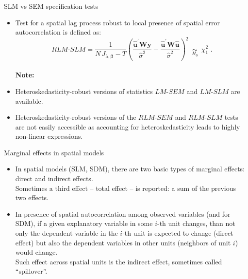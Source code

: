 \documentclass{beamer}
\begin{document}
\begin{frame}{SLM vs SEM specification tests}
\begin{itemize}
    \item Test for a spatial lag process robust to local presence of spatial error autocorrelation is defined as:
    \begin{equation*}
    \textit{RLM-SLM}=\frac{1}{N \, J_{\lambda,\bm{\beta}} - T}
    \left(\frac{\bm{\hat{u}}^{'}\bm{Wy}}{\hat{\sigma}^2}
    - \frac{\bm{\hat{u}}^{'}\bm{W\hat{u}}}{\hat{\sigma}^2} \right)^{2} 
    \,\,\, \underset{H_0}{\sim} \,\,\, \chi_1^2 \,\,.
    \end{equation*}\\
    \bigskip
    \textbf{Note:} \\ \medskip
    \item Heteroskedasticity-robust versions of statistics $\textit{LM-SEM}$ and $\textit{LM-SLM}$ are available. 
    \smallskip
    \item Heteroskedasticity-robust versions of the $\textit{RLM-SEM}$ and $\textit{RLM-SLM}$ tests are not easily accessible as accounting for heteroskedasticity leads to highly non-linear expressions.
\end{itemize}
\end{frame}
\begin{frame}{Marginal effects in spatial models}
\begin{itemize}
	\item In spatial models (SLM, SDM), there are two basic types of marginal effects: direct and indirect effects. \\ \bigskip 
	Sometimes a third effect -- total effect -- is reported: a sum of the previous two effects. 
	\bigskip
	\item In presence of spatial autocorrelation among observed variables (and for SDM), if a given explanatory variable in some $i$-th unit changes, than not only the dependent variable in the $i$-th unit is expected to change (direct effect) but also the dependent variables in other units (neighbors of unit $i$) would change. \\ \bigskip Such effect across spatial units is the indirect effect, sometimes called ``spillover''.
	\end{itemize}
\end{frame}
\end{document}
